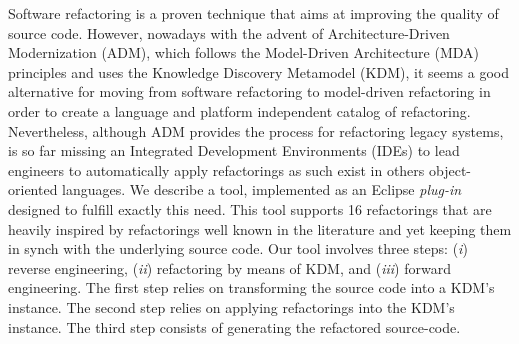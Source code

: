 

Software refactoring is a proven technique that aims at improving the quality of source code.
 However, nowadays with the advent of Architecture-Driven Modernization (ADM), 
which follows the Model-Driven Architecture (MDA) principles and uses the Knowledge Discovery Metamodel (KDM), 
it seems a good alternative for moving from software refactoring to model-driven refactoring in order to create a language and platform independent catalog of refactoring. 
Nevertheless, although ADM provides the process for refactoring legacy systems, is so far missing an Integrated Development Environments (IDEs) 
to lead engineers to automatically apply refactorings as such exist in others object-oriented languages.
 We describe a tool, implemented as an Eclipse \textit{plug-in} designed to fulfill exactly this need. 
This tool supports 16 refactorings that are heavily inspired by refactorings well known in the literature and yet keeping them in synch with the underlying source code. 
Our tool involves three steps: (\textit{i}) reverse engineering, (\textit{ii}) refactoring by means of KDM,
 and (\textit{iii}) forward engineering. 
The first step relies on transforming the source code into a KDM's instance. 
The second step relies on applying refactorings into the KDM's instance. 
The third step consists of generating the refactored source-code.



